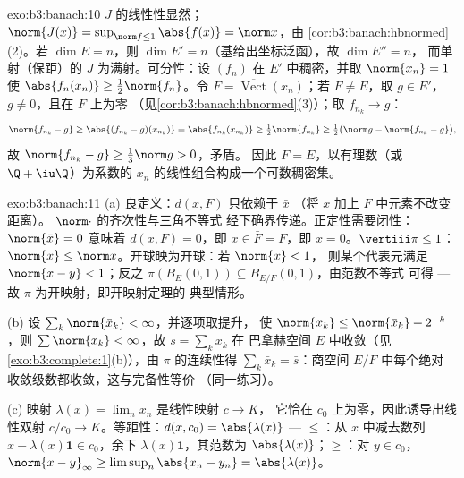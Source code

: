 \begin{solution}{exo:b3:banach:10}
$J$ 的线性性显然；$\norm{J(x)} = \sup_{\norm f \leq
1}\abs{f(x)} = \norm x$，由
\cref{cor:b3:banach:hbnormed}(2)。若 $\dim E = n$，则 $\dim E' =
n$（基给出坐标泛函），故 $\dim E'' = n$，
而单射（保距）的 $J$ 为满射。可分性：设
$(f_n)$ 在 $E'$ 中稠密，并取 $\norm{x_n} = 1$ 使
$\abs{f_n(x_n)} \geq \frac12\norm{f_n}$。令 $F =
\overline{\operatorname{Vect}}(x_n)$；若 $F \neq E$，取 $g
\in E'$，$g \neq 0$，且在 $F$ 上为零
（见\cref{cor:b3:banach:hbnormed}(3)）；取 $f_{n_k} \to g$：
\[
\norm{f_{n_k} - g} \geq \abs{(f_{n_k} - g)(x_{n_k})}
= \abs{f_{n_k}(x_{n_k})} \geq \tfrac12\norm{f_{n_k}}
\geq \tfrac12\bigl(\norm g - \norm{f_{n_k} - g}\bigr),
\]
故 $\norm{f_{n_k} - g} \geq \frac13\norm g > 0$，矛盾。
因此 $F = E$，以有理数（或 $\Q + \iu\Q$）为系数的
$x_n$ 的线性组合构成一个可数稠密集。
\end{solution}

\begin{solution}{exo:b3:banach:11}
(a) 良定义：$d(x, F)$ 只依赖于 $\bar x$
（将 $x$ 加上 $F$ 中元素不改变距离）。
$\norm\cdot$ 的齐次性与三角不等式
经下确界传递。正定性需要闭性：$\norm{\bar
x} = 0$ 意味着 $d(x, F) = 0$，即 $x \in \bar F = F$，即
$\bar x = 0$。$\vertiii\pi \leq 1$：$\norm{\bar x} \leq
\norm x$。开球映为开球：若 $\norm{\bar x} < 1$，
则某个代表元满足 $\norm{x - y} < 1$；反之
$\pi(B_E(0,1)) \subseteq B_{E/F}(0,1)$，由范数不等式
可得 --- 故 $\pi$ 为开映射，即开映射定理的
典型情形。

(b) 设 $\sum_k\norm{\bar x_k} < \infty$，并逐项取提升，
使 $\norm{x_k} \leq \norm{\bar x_k} + 2^{-k}$，则
$\sum\norm{x_k} < \infty$，故 $s = \sum_kx_k$ 在
巴拿赫空间 $E$ 中收敛（见\cref{exo:b3:complete:1}(b)），由
$\pi$ 的连续性得 $\sum_k\bar x_k = \bar s$：商空间 $E/F$ 中每个绝对
收敛级数都收敛，这与完备性等价
（同一练习）。

(c) 映射 $\lambda(x) = \lim_nx_n$ 是线性映射 $c \to K$，
它恰在 $c_0$ 上为零，因此诱导出线性双射
$c/c_0 \to K$。等距性：$d(x, c_0) = \abs{\lambda(x)}$ ---
$\leq$：从 $x$ 中减去数列 $x - \lambda(x)\mathbf
1 \in c_0$，余下 $\lambda(x)\mathbf 1$，其范数为
$\abs{\lambda(x)}$；$\geq$：对 $y \in c_0$，$\norm{x -
y}_\infty \geq \limsup_n\abs{x_n - y_n} = \abs{\lambda(x)}$。
\end{solution}

